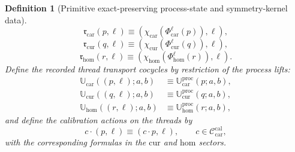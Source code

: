\documentclass[11pt]{article}
\newcommand{\TensorCalGroup}{\mathcal C_{\mathrm{car}}^{\mathrm{cal}}}
\newcommand{\TensorThreadRev}{\mathfrak r_{\mathrm{car}}}
\newcommand{\CurThreadRev}{\mathfrak r_{\mathrm{cur}}}
\newcommand{\HomThreadRev}{\mathfrak r_{\mathrm{hom}}}
\newcommand{\TensorThreadRep}{\mathbb U_{\mathrm{car}}}
\newcommand{\CurThreadRep}{\mathbb U_{\mathrm{cur}}}
\newcommand{\HomThreadRep}{\mathbb U_{\mathrm{hom}}}
\newcommand{\TensorOrbitFlow}{\Phi_{\mathrm{car}}}
\newcommand{\CurOrbitFlow}{\Phi_{\mathrm{cur}}}
\newcommand{\HomOrbitFlow}{\Phi_{\mathrm{hom}}}
\newcommand{\TensorProcTimeRev}{\chi_{\mathrm{car}}}
\newcommand{\CurProcTimeRev}{\chi_{\mathrm{cur}}}
\newcommand{\HomProcTimeRev}{\chi_{\mathrm{hom}}}
\newcommand{\TensorProcLift}{\mathbb U_{\mathrm{car}}^{\mathrm{proc}}}
\newcommand{\CurProcLift}{\mathbb U_{\mathrm{cur}}^{\mathrm{proc}}}
\newcommand{\HomProcLift}{\mathbb U_{\mathrm{hom}}^{\mathrm{proc}}}
\newtheorem{definition}{Definition}
\begin{document}
\begin{definition}[Primitive exact-preserving process-state and symmetry-kernel data]
\begin{equation}
\TensorThreadRev(p,\ell)\equiv(\TensorProcTimeRev(\TensorOrbitFlow^\ell(p)),\ell),
\label{eq:thread_rev_car}
\end{equation}
\begin{equation}
\CurThreadRev(q,\ell)\equiv(\CurProcTimeRev(\CurOrbitFlow^\ell(q)),\ell),
\label{eq:thread_rev_cur}
\end{equation}
\begin{equation}
\HomThreadRev(r,\ell)\equiv(\HomProcTimeRev(\HomOrbitFlow^\ell(r)),\ell).
\label{eq:thread_rev_hom}
\end{equation}
Define the recorded thread transport cocycles by restriction of the process lifts:
\begin{equation}
\begin{aligned}
\TensorThreadRep((p,\ell);a,b)&\equiv\TensorProcLift(p;a,b),\\
\CurThreadRep((q,\ell);a,b)&\equiv\CurProcLift(q;a,b),\\
\HomThreadRep((r,\ell);a,b)&\equiv\HomProcLift(r;a,b),
\end{aligned}
\label{eq:thread_lifts_from_process}
\end{equation}
and define the calibration actions on the threads by
\begin{equation}
c\cdot(p,\ell)\equiv(c\cdot p,\ell),
\qquad
c\in\TensorCalGroup,
\label{eq:thread_cal_action_car}
\end{equation}
with the corresponding formulas in the \(\mathrm{cur}\) and \(\mathrm{hom}\) sectors.
\end{definition}
\end{document}
